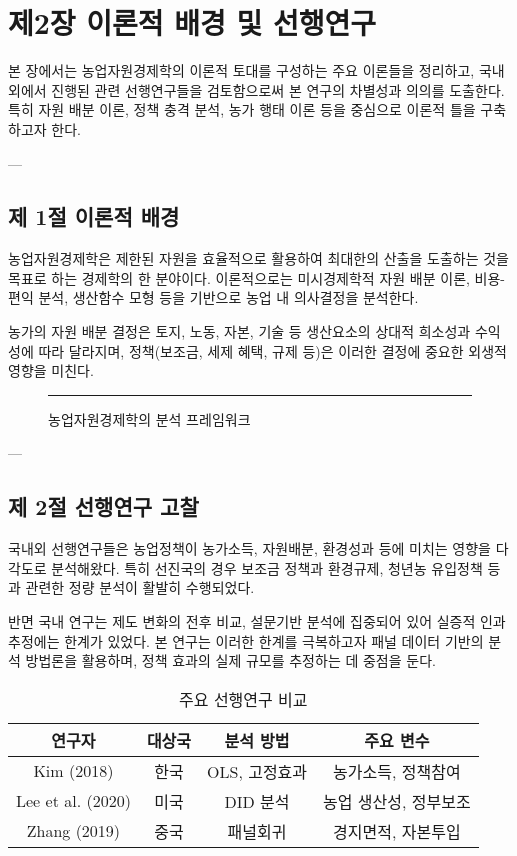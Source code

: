 \chapter{제2장 이론적 배경 및 선행연구}

본 장에서는 농업자원경제학의 이론적 토대를 구성하는 주요 이론들을 정리하고,  
국내외에서 진행된 관련 선행연구들을 검토함으로써 본 연구의 차별성과 의의를 도출한다.  
특히 자원 배분 이론, 정책 충격 분석, 농가 행태 이론 등을 중심으로 이론적 틀을 구축하고자 한다.

---

\section{제 1절 이론적 배경}

농업자원경제학은 제한된 자원을 효율적으로 활용하여 최대한의 산출을 도출하는 것을 목표로 하는 경제학의 한 분야이다.  
이론적으로는 미시경제학적 자원 배분 이론, 비용-편익 분석, 생산함수 모형 등을 기반으로 농업 내 의사결정을 분석한다.

농가의 자원 배분 결정은 토지, 노동, 자본, 기술 등 생산요소의 상대적 희소성과 수익성에 따라 달라지며,  
정책(보조금, 세제 혜택, 규제 등)은 이러한 결정에 중요한 외생적 영향을 미친다.

\begin{figure}[htbp]
  \centering
  \rule{0.8\linewidth}{5cm} %
  \caption{농업자원경제학의 분석 프레임워크}\label{fig:chapter2_1}
\end{figure}

---

\section{제 2절 선행연구 고찰}

국내외 선행연구들은 농업정책이 농가소득, 자원배분, 환경성과 등에 미치는 영향을 다각도로 분석해왔다.  
특히 선진국의 경우 보조금 정책과 환경규제, 청년농 유입정책 등과 관련한 정량 분석이 활발히 수행되었다.  

반면 국내 연구는 제도 변화의 전후 비교, 설문기반 분석에 집중되어 있어 실증적 인과 추정에는 한계가 있었다.  
본 연구는 이러한 한계를 극복하고자 패널 데이터 기반의 분석 방법론을 활용하며,  
정책 효과의 실제 규모를 추정하는 데 중점을 둔다.

\begin{table}[htbp]
  \centering
  \begin{tabular}{|c|c|c|c|}
    \hline
    연구자 & 대상국 & 분석 방법 & 주요 변수 \\
    \hline
    Kim (2018) & 한국 & OLS, 고정효과 & 농가소득, 정책참여 \\
    Lee et al. (2020) & 미국 & DID 분석 & 농업 생산성, 정부보조 \\
    Zhang (2019) & 중국 & 패널회귀 & 경지면적, 자본투입 \\
    \hline
  \end{tabular}
  \caption{주요 선행연구 비교}\label{tab:chapter2_1}
\end{table}

